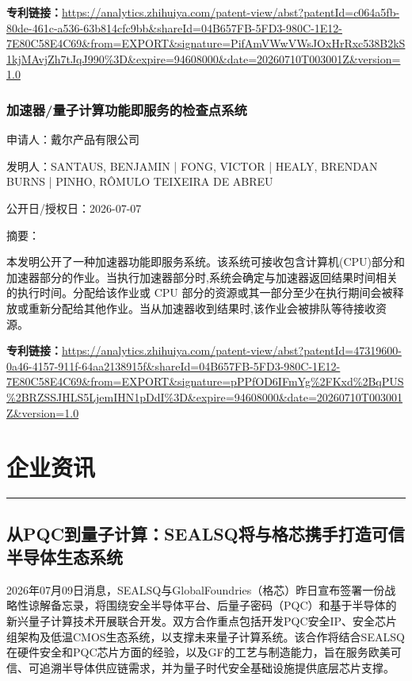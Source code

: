 \documentclass[12pt,a4paper]{ctexart}
\begin{document}
\noindent\textbf{专利链接：}\url{https://analytics.zhihuiya.com/patent-view/abst?patentId=c064a5fb-80de-461c-a536-63b814cfc9bb&shareId=04B657FB-5FD3-980C-1E12-7E80C58E4C69&from=EXPORT&signature=PifAmVWwVWsJOxHrRxc538B2kS1kjMAvjZh7tJqJ990%3D&expire=94608000&date=20260710T003001Z&version=1.0}

\subsubsection{ 加速器/量子计算功能即服务的检查点系统 }

申请人：戴尔产品有限公司

发明人：SANTAUS, BENJAMIN | FONG, VICTOR | HEALY, BRENDAN BURNS | PINHO, RÔMULO TEIXEIRA DE ABREU

公开日/授权日：2026-07-07

摘要：

本发明公开了一种加速器功能即服务系统。该系统可接收包含计算机(CPU)部分和加速器部分的作业。当执行加速器部分时,系统会确定与加速器返回结果时间相关的执行时间。分配给该作业或 CPU 部分的资源或其一部分至少在执行期间会被释放或重新分配给其他作业。当从加速器收到结果时,该作业会被排队等待接收资源。

\noindent\textbf{专利链接：}\url{https://analytics.zhihuiya.com/patent-view/abst?patentId=47319600-0a46-4157-911f-64aa2138915f&shareId=04B657FB-5FD3-980C-1E12-7E80C58E4C69&from=EXPORT&signature=pPPfOD6IFmYg%2FKxd%2BqPUS%2BRZSSJHLS5LjemIHN1pDdI%3D&expire=94608000&date=20260710T003001Z&version=1.0}




\newpage
\section{企业资讯}
\vspace{-0.5em}
\noindent\rule{\linewidth}{1.5pt}

\subsection{ 从PQC到量子计算：SEALSQ将与格芯携手打造可信半导体生态系统 }

2026年07月09日消息，SEALSQ与GlobalFoundries（格芯）昨日宣布签署一份战略性谅解备忘录，将围绕安全半导体平台、后量子密码（PQC）和基于半导体的新兴量子计算技术开展联合开发。双方合作重点包括开发PQC安全IP、安全芯片组架构及低温CMOS生态系统，以支撑未来量子计算系统。该合作将结合SEALSQ在硬件安全和PQC芯片方面的经验，以及GF的工艺与制造能力，旨在服务欧美可信、可追溯半导体供应链需求，并为量子时代安全基础设施提供底层芯片支撑。
\end{document}

